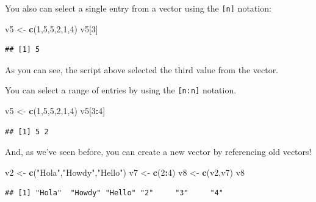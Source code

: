 \documentclass[
]{book}
\newenvironment{Shaded}{\begin{snugshade}}{\end{snugshade}}
\newcommand{\DecValTok}[1]{\textcolor[rgb]{0.00,0.00,0.81}{#1}}
\newcommand{\KeywordTok}[1]{\textcolor[rgb]{0.13,0.29,0.53}{\textbf{#1}}}
\newcommand{\NormalTok}[1]{#1}
\newcommand{\OperatorTok}[1]{\textcolor[rgb]{0.81,0.36,0.00}{\textbf{#1}}}
\newcommand{\StringTok}[1]{\textcolor[rgb]{0.31,0.60,0.02}{#1}}
\begin{document}
You also can select a single entry from a vector using the \texttt{{[}n{]}} notation:

\begin{Shaded}
\begin{Highlighting}[]
\NormalTok{v5 <-}\StringTok{ }\KeywordTok{c}\NormalTok{(}\DecValTok{1}\NormalTok{,}\DecValTok{5}\NormalTok{,}\DecValTok{5}\NormalTok{,}\DecValTok{2}\NormalTok{,}\DecValTok{1}\NormalTok{,}\DecValTok{4}\NormalTok{)}
\NormalTok{v5[}\DecValTok{3}\NormalTok{]}
\end{Highlighting}
\end{Shaded}

\begin{verbatim}
## [1] 5
\end{verbatim}

As you can see, the script above selected the third value from the vector.

You can select a range of entries by using the \texttt{{[}n:n{]}} notation.

\begin{Shaded}
\begin{Highlighting}[]
\NormalTok{v5 <-}\StringTok{ }\KeywordTok{c}\NormalTok{(}\DecValTok{1}\NormalTok{,}\DecValTok{5}\NormalTok{,}\DecValTok{5}\NormalTok{,}\DecValTok{2}\NormalTok{,}\DecValTok{1}\NormalTok{,}\DecValTok{4}\NormalTok{)}
\NormalTok{v5[}\DecValTok{3}\OperatorTok{:}\DecValTok{4}\NormalTok{]}
\end{Highlighting}
\end{Shaded}

\begin{verbatim}
## [1] 5 2
\end{verbatim}

And, as we've seen before, you can create a new vector by referencing old vectors!

\begin{Shaded}
\begin{Highlighting}[]
\NormalTok{v2 <-}\StringTok{ }\KeywordTok{c}\NormalTok{(}\StringTok{"Hola"}\NormalTok{,}\StringTok{"Howdy"}\NormalTok{,}\StringTok{"Hello"}\NormalTok{)}
\NormalTok{v7 <-}\StringTok{ }\KeywordTok{c}\NormalTok{(}\DecValTok{2}\OperatorTok{:}\DecValTok{4}\NormalTok{)}
\NormalTok{v8 <-}\StringTok{ }\KeywordTok{c}\NormalTok{(v2,v7)}
\NormalTok{v8}
\end{Highlighting}
\end{Shaded}

\begin{verbatim}
## [1] "Hola"  "Howdy" "Hello" "2"     "3"     "4"
\end{verbatim}
\end{document}
